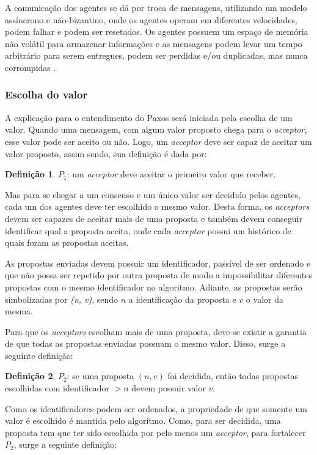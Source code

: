 \documentclass[
    12pt,
    openright, 
    oneside,
    a4paper,
    french,
    english,
    brazil
    ]{facom-ufu-abntex2}
\theoremstyle{definition}
\newtheorem{definition}{Definição}
\begin{document}
A comunicação dos agentes se dá por troca de mensagens, utilizando um modelo assíncrono e
não-bizantino, onde os agentes operam em diferentes velocidades, podem falhar e podem ser
resetados. Os agentes possuem um espaço de memória não volátil para armazenar informações e
as mensagens podem levar um tempo arbitrário para serem entregues, podem ser perdidas e/ou 
duplicadas, mas nunca corrompidas \cite{lamport2001paxos}.

\subsubsection{Escolha do valor}
A explicação para o entendimento do Paxos será iniciada pela escolha de um valor. 
Quando uma mensagem, com algum valor proposto chega para o \emph{acceptor}, esse valor pode 
ser aceito ou não. Logo, um \emph{acceptor} deve ser capaz de aceitar um valor proposto, 
assim sendo, sua definição é dada por:

\begin{definition}
$P_1$: um \emph{acceptor} deve aceitar o primeiro valor que receber.
\end{definition}

Mas para se chegar a um consenso e um único valor ser decidido pelos agentes, cada um
dos agentes deve ter escolhido o mesmo valor. Desta forma, os \emph{acceptors} devem
ser capazes de aceitar mais de uma proposta e também devem conseguir identificar qual
a proposta aceita, onde cada \emph{acceptor} possui um histórico de quais foram as
propostas aceitas.

As propostas enviadas devem possuir um identificador, passível de ser ordenado e que não 
possa ser repetido por outra proposta de modo a impossibilitar diferentes propostas com o mesmo
identificador no algoritmo. Adiante, as propostas serão simbolizadas por 
\emph{(n, v)}, sendo $n$ a identificação da proposta e $v$ o valor da mesma.

Para que os \emph{acceptors} escolham mais de uma proposta, deve-se existir a garantia de
que todas as propostas enviadas possuam o mesmo valor. Disso, surge a seguinte definição:

\begin{definition}
$P_2$: se uma proposta $(n, v)$ foi decidida, então todas propostas escolhidas com 
identificador $>n$ devem possuir valor $v$.
\end{definition}

Como os identificadores podem ser ordenados, a propriedade de que somente um valor é escolhido
é mantida pelo algoritmo. Como, para ser decidida, uma proposta tem que ter sido escolhida
por pelo menos um \emph{acceptor}, para fortalecer $P_2$, surge a seguinte definição:
\end{document}
